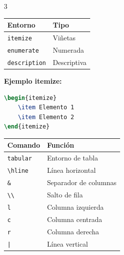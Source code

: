 \documentclass[10pt,landscape]{article}
\newcommand{\comando}[1]{\texttt{\textcolor{azulprofundo}{#1}}}
\begin{document}
\begin{multicols}{3}
\vspace{0.5cm}

\tcbox[colback=grisclaro, colframe=azulprofundo, arc=3pt, boxsep=2pt, left=2pt, right=2pt, top=2pt, bottom=2pt]{
    \textbf{\textcolor{azulprofundo}{📋 LISTAS}}
}
\vspace{0.3cm}

\begin{tabular}{@{}ll@{}}
    \toprule
    \textbf{Entorno} & \textbf{Tipo} \\
    \midrule
    \comando{itemize} & Viñetas \\
    \comando{enumerate} & Numerada \\
    \comando{description} & Descriptiva \\
    \bottomrule
\end{tabular}

\vspace{0.3cm}

\textbf{Ejemplo itemize:}
\begin{lstlisting}[language=TeX, basicstyle=\ttfamily\scriptsize]
\begin{itemize}
    \item Elemento 1
    \item Elemento 2
\end{itemize}
\end{lstlisting}

\vspace{0.5cm}

\tcbox[colback=grisclaro, colframe=azulprofundo, arc=3pt, boxsep=2pt, left=2pt, right=2pt, top=2pt, bottom=2pt]{
    \textbf{\textcolor{azulprofundo}{📊 TABLAS}}
}
\vspace{0.3cm}

\begin{tabular}{@{}ll@{}}
    \toprule
    \textbf{Comando} & \textbf{Función} \\
    \midrule
    \comando{tabular} & Entorno de tabla \\
    \comando{\textbackslash hline} & Línea horizontal \\
    \comando{\&} & Separador de columnas \\
    \comando{\textbackslash\textbackslash} & Salto de fila \\
    \comando{l} & Columna izquierda \\
    \comando{c} & Columna centrada \\
    \comando{r} & Columna derecha \\
    \comando{|} & Línea vertical \\
    \bottomrule
\end{tabular}


\end{multicols}
\end{document}
